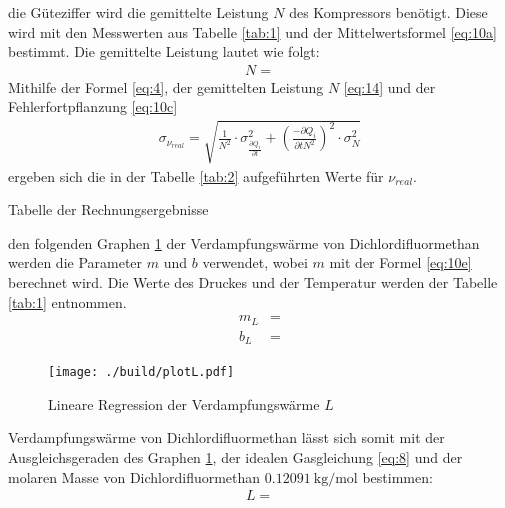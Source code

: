 \justifying die Güteziffer wird die gemittelte Leistung $N$ des Kompressors benötigt. Diese wird mit den Messwerten aus Tabelle
\ref{tab:1} und der Mittelwertsformel \eqref{eq:10a} bestimmt. Die gemittelte Leistung lautet wie folgt:
\begin{align}
    N = \text{} \label{eq:14}
\end{align}
Mithilfe der Formel \eqref{eq:4}, der gemittelten Leistung $N$ \eqref{eq:14} und der Fehlerfortpflanzung \eqref{eq:10c}
\begin{align}
    \sigma_{\nu_{real}} = \sqrt{\frac{1}{N^2} \cdot \sigma_{\frac{\partial Q_i}{\partial t}}^2 + \left( \frac{-\partial Q_i}{\partial t N^2} \right)^2 \cdot \sigma_{N}^2} \label{eq:15}
\end{align}
ergeben sich die in der Tabelle \ref{tab:2} aufgeführten Werte für $\nu_{real}$.

\begin{table}[H]
    \centering
    
    \caption{Tabelle der Rechnungsergebnisse}
    \label{tab:3}
\end{table}

\justifying den folgenden Graphen \ref{fig:4} der Verdampfungswärme von Dichlordifluormethan werden die Parameter $m$ und $b$ verwendet, wobei $m$ mit der
Formel \eqref{eq:10e} berechnet wird. Die Werte des Druckes und der Temperatur werden der Tabelle \ref{tab:1} entnommen. 
\begin{subequations}\label{eq:16}
\begin{align}
    m_L &= \text{}\label{eq:16a}\\
    b_L &= \text{}\label{eq:16b}
\end{align}
\end{subequations}

\begin{figure}[H]
    \centering
    \texttt{[image: ./build/plotL.pdf]}
    \caption{Lineare Regression der Verdampfungswärme $L$}
    \label{fig:4}
\end{figure}

\justifying Verdampfungswärme von Dichlordifluormethan lässt sich somit mit der Ausgleichsgeraden des Graphen \ref{fig:4}, 
der idealen Gasgleichung \eqref{eq:8} und der molaren Masse von Dichlordifluormethan $\SI{0.12091}{\kilo\gram\per\mole}$ \cite{Molmasse} bestimmen:
\begin{align}
    L = \text{}\label{eq:17}
\end{align}


